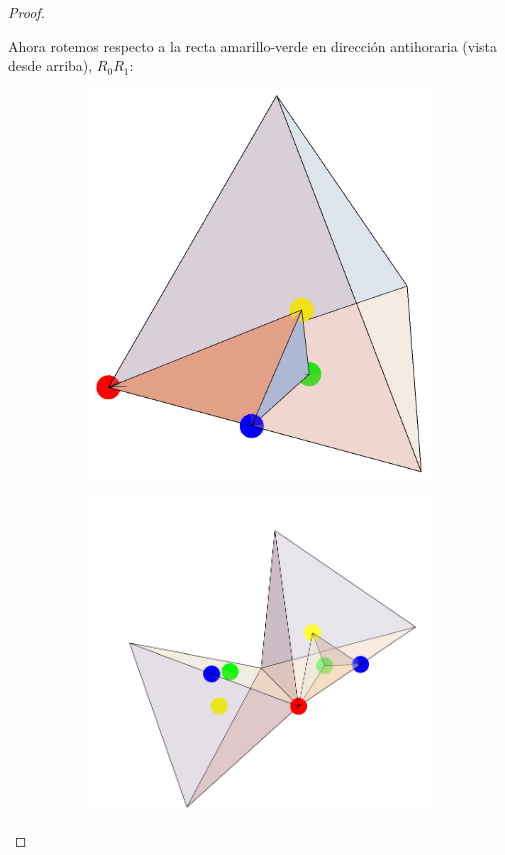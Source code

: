 \documentclass[spanish]{article}
\theoremstyle{definition}
\begin{document}
\begin{proof}
\begin{figure}[H]
\begin{subfigure}{0.5\linewidth}
		\end{subfigure}
	\end{figure}
	Ahora rotemos respecto a la recta amarillo-verde en dirección antihoraria (vista desde arriba), $R_0R_1$:
	\begin{figure}[H]
		\begin{subfigure}{0.4\linewidth}
			\centering
			\includegraphics[width=0.6\linewidth]{p5}
		\end{subfigure}
		\begin{subfigure}{0.4\linewidth}
			\centering
			\includegraphics[width=0.9\linewidth]{p7}

\end{subfigure}
\end{figure}
\end{proof}
\end{document}

